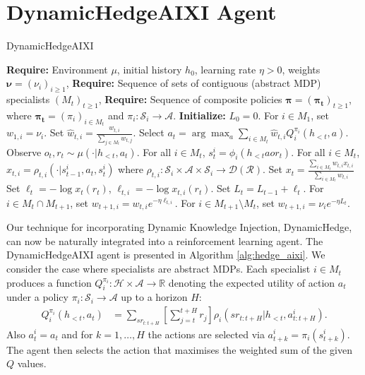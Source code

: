 \documentclass[letterpaper]{article} %
\newcommand {\St}{\mathcal{S}}
\newcommand {\A}{\mathcal{A}}
\newcommand {\Hist}{\mathcal{H}}
\newcommand {\Dist}{\mathcal{D}}
\newcommand {\Reward}{\mathcal{R}}
\newcommand {\R}{\mathbb{R}}
\theoremstyle{definition}
\begin{document}
\section{DynamicHedgeAIXI Agent}
\begin{algorithm}
\caption{DynamicHedgeAIXI}\label{alg:hedge_aixi}
    \begin{algorithmic}[1]
    \State \textbf{Require:} Environment $\mu$, initial history $h_0$, learning rate $\eta > 0$, weights $\bm{\nu} = (\nu_i)_{i \geq 1}$, 
    \State \textbf{Require:} Sequence of sets of contiguous (abstract MDP) specialists $(M_t)_{t \geq 1}$, 
    \State \textbf{Require:} Sequence of composite policies $\bm{\pi} = (\bm{\pi_t})_{t \geq 1}$, where $\bm{\pi_t} = (\pi_i)_{i \in M_t}$ and $\pi_i: \St_i \to \A$.
    \State \textbf{Initialize:} $L_0 = 0$. For $i \in M_1$, set $w_{1, i} = \nu_i$. %
        \State Set $\hat{w}_{t, i} = \frac{w_{t, i}}{\sum_{j \in M_t} w_{t, j}}$.
        \State Select $a_t = \arg\max_{a} \sum_{i \in M_t} \hat{w}_{t, i} Q_i^{\pi_i}(h_{<t}, a)$. \label{alg:DHA_action_selection}
        \State Observe $o_t, r_t \sim \mu(\cdot | h_{<t}, a_t)$. %
        \State For all $i \in M_t$, $s^i_t = \phi_i(h_{<t}aor_t)$. 
        \State For all $i \in M_t$, $x_{t, i} = \rho_{t, i}(\cdot| s_{t-1}^{i}, a_t, s_{t}^{i})$ where $\rho_{t, i}: \St_{i} \times \A \times \St_{i} \to \Dist(\Reward)$.
        \State Set $x_t = \frac{\sum_{i \in M_t} w_{t, i} x_{t, i}}{\sum_{i \in M_t} w_{t, i} }$
        \State Set $\ell_t = -\log x_t(r_t)$, $\ell_{t, i} = - \log x_{t, i}(r_t)$.
        \State Set $L_t = L_{t-1} + \ell_t$.
        \State For $i \in M_t \cap M_{t+1}$, set $w_{t+1, i} = w_{t, i} e^{- \eta \ell_{t, i}}$. 
        \State For $i \in M_{t+1} \setminus M_t$, set $w_{t+1, i} = \nu_i e^{- \eta L_t}$.%
    \EndFor
    \end{algorithmic}
\end{algorithm}

Our technique for incorporating Dynamic Knowledge Injection, DynamicHedge, can now be naturally integrated into a reinforcement learning agent.
The DynamicHedgeAIXI agent is presented in Algorithm \ref{alg:hedge_aixi}.
We consider the case where specialists are abstract MDPs.
Each specialist $i \in M_t$ produces a function $Q_i^{\pi_i}: \Hist \times \A \to \R$ denoting the expected utility of action $a_t$ under a policy $\pi_i: \St_{i} \to \A$ up to a horizon $H$:
\begin{align}
    Q_{i}^{\pi_i}(h_{<t}, a_t) 
    &= \sum_{sr_{t:t+H}} \left[ \sum_{j=t}^{t+H} r_j \right] \rho_i(sr_{t:t+H} | h_{<t}, a^{i}_{t:t+H}). \label{eqn:specialist_Q}
\end{align}
Also $a^{i}_t = a_t$ and for $k = 1, \ldots, H$ the actions are selected via $a^{i}_{t+k} = \pi_i(s^{i}_{t+k})$.
The agent then selects the action that maximises the weighted sum of the given $Q$ values.
\end{document}
